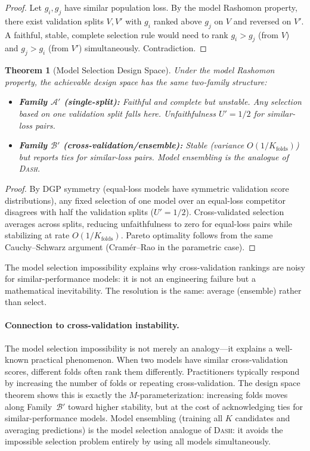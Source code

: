 \documentclass{article}
\newtheorem{theorem}{Theorem}
\newcommand{\DASH}{\textsc{Dash}}
\begin{document}
\begin{proof}
Let $g_i, g_j$ have similar population loss. By the model Rashomon property, there exist validation splits $V, V'$ with $g_i$ ranked above $g_j$ on $V$ and reversed on $V'$. A faithful, stable, complete selection rule would need to rank $g_i > g_j$ (from $V$) and $g_j > g_i$ (from $V'$) simultaneously. Contradiction.
\end{proof}

\begin{theorem}[Model Selection Design Space]
\label{thm:model-selection-ds}
Under the model Rashomon property, the achievable design space has the same two-family structure:
\begin{itemize}
    \item \textbf{Family $\mathcal{A}'$ (single-split):} Faithful and complete but unstable. Any selection based on one validation split falls here. Unfaithfulness $U' = 1/2$ for similar-loss pairs.
    \item \textbf{Family $\mathcal{B}'$ (cross-validation/ensemble):} Stable (variance $O(1/K_{\text{folds}})$) but reports ties for similar-loss pairs. Model ensembling is the analogue of \DASH{}.
\end{itemize}
\end{theorem}

\begin{proof}
By DGP symmetry (equal-loss models have symmetric validation score distributions), any fixed selection of one model over an equal-loss competitor disagrees with half the validation splits ($U' = 1/2$). Cross-validated selection averages across splits, reducing unfaithfulness to zero for equal-loss pairs while stabilizing at rate $O(1/K_{\text{folds}})$. Pareto optimality follows from the same Cauchy--Schwarz argument (Cram\'er--Rao in the parametric case).
\end{proof}

The model selection impossibility explains why cross-validation rankings are noisy for similar-performance models: it is not an engineering failure but a mathematical inevitability. The resolution is the same: average (ensemble) rather than select.

\paragraph{Connection to cross-validation instability.}
The model selection impossibility is not merely an analogy---it explains a well-known practical phenomenon. When two models have similar cross-validation scores, different folds often rank them differently. Practitioners typically respond by increasing the number of folds or repeating cross-validation. The design space theorem shows this is exactly the $M$-parameterization: increasing folds moves along Family~$\mathcal{B}'$ toward higher stability, but at the cost of acknowledging ties for similar-performance models. Model ensembling (training all $K$ candidates and averaging predictions) is the model selection analogue of \DASH{}: it avoids the impossible selection problem entirely by using all models simultaneously.
\end{document}
